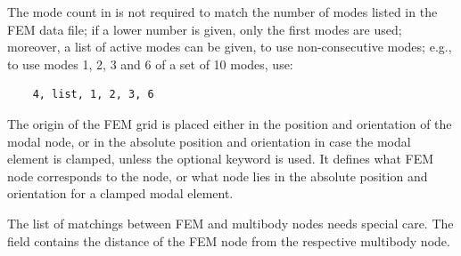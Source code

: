 \noindent
The mode count in  is not required to match
the number of modes listed in the FEM data file; if a lower number
is given, only the first  modes are used;
moreover, a list of active modes can be given, to use non-consecutive
modes; e.g., to use modes 1, 2, 3 and 6 of a set of 10 modes, use:
\begin{verbatim}
	4, list, 1, 2, 3, 6
\end{verbatim}

\noindent
The origin of the FEM grid is placed either in the position and orientation 
of the modal node, or in the absolute position and orientation 
in case the modal element is clamped, unless the  
optional keyword is used.
It defines what FEM node corresponds to the  node,
or what node lies in the absolute position and orientation
for a clamped modal element.

\noindent
The list of matchings between FEM and multibody nodes needs
special care.
The  field contains the distance
of the FEM node from the respective multibody node.

